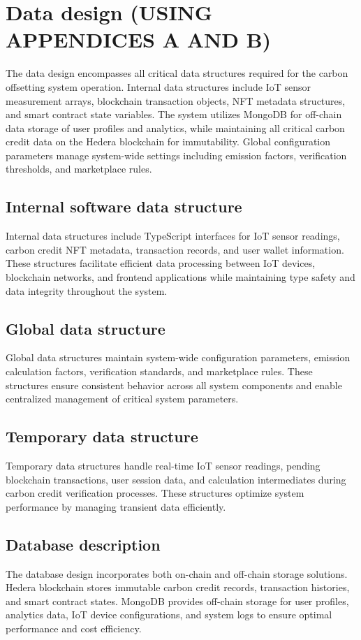 \documentclass[oneside,a4paper,12pt]{book}
\begin{document}
\section{Data design (USING APPENDICES A AND B)}   
The data design encompasses all critical data structures required for the carbon offsetting system operation. Internal data structures include IoT sensor measurement arrays, blockchain transaction objects, NFT metadata structures, and smart contract state variables. The system utilizes MongoDB for off-chain data storage of user profiles and analytics, while maintaining all critical carbon credit data on the Hedera blockchain for immutability. Global configuration parameters manage system-wide settings including emission factors, verification thresholds, and marketplace rules.

\subsection{Internal software data structure}
Internal data structures include TypeScript interfaces for IoT sensor readings, carbon credit NFT metadata, transaction records, and user wallet information. These structures facilitate efficient data processing between IoT devices, blockchain networks, and frontend applications while maintaining type safety and data integrity throughout the system.

\subsection{Global data structure}
Global data structures maintain system-wide configuration parameters, emission calculation factors, verification standards, and marketplace rules. These structures ensure consistent behavior across all system components and enable centralized management of critical system parameters.

\subsection{Temporary data structure}
Temporary data structures handle real-time IoT sensor readings, pending blockchain transactions, user session data, and calculation intermediates during carbon credit verification processes. These structures optimize system performance by managing transient data efficiently.

\subsection{Database description}
The database design incorporates both on-chain and off-chain storage solutions. Hedera blockchain stores immutable carbon credit records, transaction histories, and smart contract states. MongoDB provides off-chain storage for user profiles, analytics data, IoT device configurations, and system logs to ensure optimal performance and cost efficiency.
\end{document}
